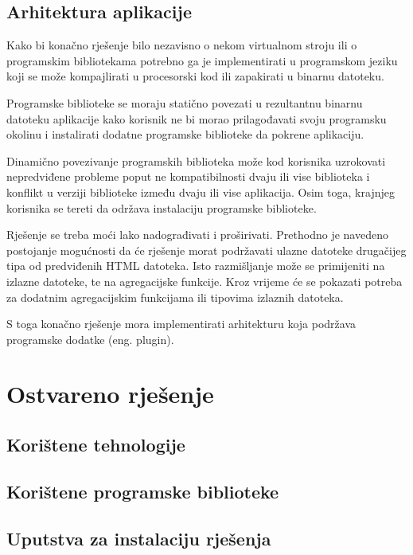 \documentclass[times, utf8, zavrsni]{fer}
\begin{document}
\section{Arhitektura aplikacije}


Kako bi konačno rješenje bilo nezavisno o nekom virtualnom stroju ili o
programskim bibliotekama potrebno ga je implementirati u programskom jeziku
koji se može kompajlirati u procesorski kod ili zapakirati u binarnu datoteku.

Programske biblioteke se moraju statično povezati u rezultantnu binarnu
datoteku aplikacije kako korisnik ne bi morao prilagođavati svoju programsku
okolinu i instalirati dodatne programske biblioteke da pokrene aplikaciju.

Dinamično povezivanje programskih biblioteka može kod korisnika uzrokovati
nepredviđene probleme poput ne kompatibilnosti dvaju ili vise biblioteka i
konflikt u verziji biblioteke između dvaju ili vise aplikacija. Osim toga,
krajnjeg korisnika se tereti da održava instalaciju programske biblioteke.

Rješenje se treba moći lako nadograđivati i proširivati. Prethodno je navedeno
postojanje mogućnosti da će rješenje morat podržavati ulazne datoteke
drugačijeg tipa od predviđenih HTML datoteka. Isto razmišljanje može se
primijeniti na izlazne datoteke, te na agregacijske funkcije. Kroz vrijeme će
se pokazati potreba za dodatnim agregacijskim funkcijama ili tipovima izlaznih
datoteka.

S toga konačno rješenje mora implementirati arhitekturu koja
podržava programske dodatke (eng. plugin).




\chapter{Ostvareno rješenje}

\section{Korištene tehnologije}

\section{Korištene programske biblioteke}

\section{Uputstva za instalaciju rješenja}
\end{document}

